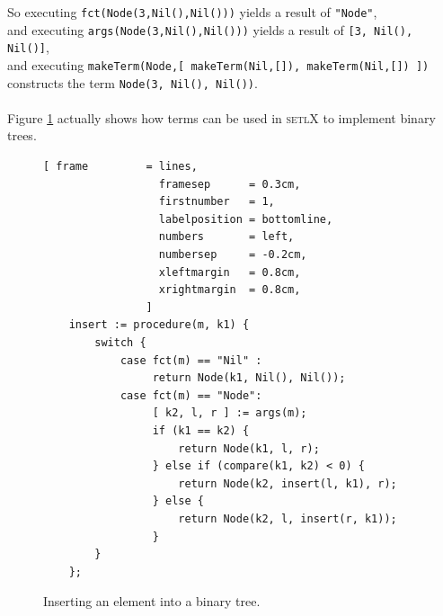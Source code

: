 \documentclass[11pt]{article}
\begin{document}
So executing \texttt{fct(Node(3,Nil(),Nil()))} yields a result of \texttt{"Node"},\\
and executing \texttt{args(Node(3,Nil(),Nil()))} yields a result of \texttt{[3, Nil(), Nil()]},\\
and executing \texttt{makeTerm(Node,[ makeTerm(Nil,[]), makeTerm(Nil,[]) ])} constructs the term \texttt{Node(3, Nil(), Nil())}.
\\
\\
Figure \ref{fig:binary-tree-no-matching.stlx} actually shows how terms can be used in \textsc{setlX} to implement binary trees.
\pagebreak
\begin{figure}[!ht]
\centering
\begin{Verbatim}[ frame         = lines, 
                  framesep      = 0.3cm, 
                  firstnumber   = 1,
                  labelposition = bottomline,
                  numbers       = left,
                  numbersep     = -0.2cm,
                  xleftmargin   = 0.8cm,
                  xrightmargin  = 0.8cm,
                ]
    insert := procedure(m, k1) {
        switch {
            case fct(m) == "Nil" : 
                 return Node(k1, Nil(), Nil());
            case fct(m) == "Node": 
                 [ k2, l, r ] := args(m);
                 if (k1 == k2) {
                     return Node(k1, l, r);
                 } else if (compare(k1, k2) < 0) { 
                     return Node(k2, insert(l, k1), r);
                 } else {
                     return Node(k2, l, insert(r, k1));
                 }
        }
    };
\end{Verbatim}
\vspace*{-0.3cm}
\caption{Inserting an element into a binary tree.}
\label{fig:binary-tree-no-matching.stlx}
\end{figure}
\end{document}
